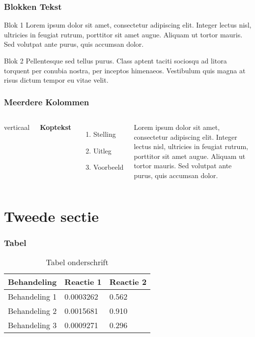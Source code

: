 \documentclass[aspectratio=169]{uva-inf-presentation}
\begin{document}

\begin{frame}
\frametitle{Blokken Tekst}
\begin{block}{Blok 1}
Lorem ipsum dolor sit amet, consectetur adipiscing elit. Integer lectus nisl,
ultricies in feugiat rutrum, porttitor sit amet augue. Aliquam ut tortor mauris.
Sed volutpat ante purus, quis accumsan dolor.
\end{block}

\begin{block}{Blok 2}
Pellentesque sed tellus purus. Class aptent taciti
sociosqu ad litora torquent per conubia nostra, per inceptos himenaeos.
Vestibulum quis magna at risus dictum tempor eu vitae velit.
\end{block}
\end{frame}


\begin{frame}
\frametitle{Meerdere Kolommen}
\begin{columns}[c]
 verticaal

\textbf{Koptekst}
\begin{enumerate}
\item Stelling
\item Uitleg
\item Voorbeeld
\end{enumerate}

Lorem ipsum dolor sit amet, consectetur adipiscing elit. Integer lectus nisl,
ultricies in feugiat rutrum, porttitor sit amet augue. Aliquam ut tortor mauris.
Sed volutpat ante purus, quis accumsan dolor.
\end{columns}
\end{frame}


\section{Tweede sectie}


\begin{frame}
\frametitle{Tabel}
\begin{table}
\begin{tabular}{l l l}
\toprule
\textbf{Behandeling} & \textbf{Reactie 1} & \textbf{Reactie 2}\\
\midrule
Behandeling 1 & 0.0003262 & 0.562 \\
Behandeling 2 & 0.0015681 & 0.910 \\
Behandeling 3 & 0.0009271 & 0.296 \\
\bottomrule
\end{tabular}
\caption{Tabel onderschrift}
\end{table}
\end{frame}
\end{document}
